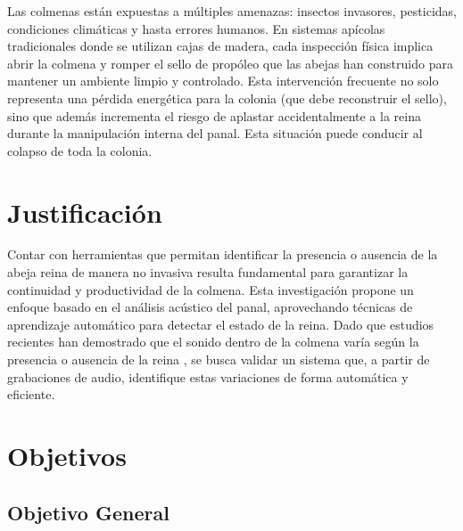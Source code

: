 \documentclass[12pt]{report}
\newenvironment{tightmulticols}{%
  \begin{multicols}{2}
  \setlength{\parskip}{0pt}
  \setlength{\parindent}{0em}
  \linespread{1}\selectfont
}{%
  \end{multicols}
}
\begin{document}
\begin{tightmulticols}
\par Las colmenas están expuestas a múltiples amenazas: insectos invasores, pesticidas, condiciones climáticas y hasta errores humanos. En sistemas apícolas tradicionales donde se utilizan cajas de madera, cada inspección física implica abrir la colmena y romper el sello de propóleo que las abejas han construido para mantener un ambiente limpio y controlado. Esta intervención frecuente no solo representa una pérdida energética para la colonia (que debe reconstruir el sello), sino que además incrementa el riesgo de aplastar accidentalmente a la reina durante la manipulación interna del panal. Esta situación puede conducir al colapso de toda la colonia.


\section{Justificación}

\par Contar con herramientas que permitan identificar la presencia o ausencia de la abeja reina de manera no invasiva resulta fundamental para garantizar la continuidad y productividad de la colmena. Esta investigación propone un enfoque basado en el análisis acústico del panal, aprovechando técnicas de aprendizaje automático para detectar el estado de la reina. Dado que estudios recientes han demostrado que el sonido dentro de la colmena varía según la presencia o ausencia de la reina \cite{ruvinga2021use, maarefremote, hunter2013signal, ruvinga2023identifying}, se busca validar un sistema que, a partir de grabaciones de audio, identifique estas variaciones de forma automática y eficiente.


\section{Objetivos}

\subsection{Objetivo General}


\end{tightmulticols}
\end{document}
